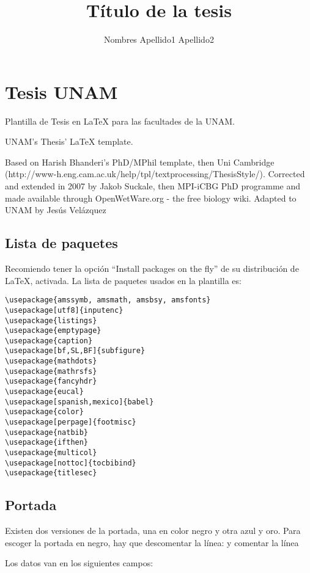 \documentclass[]{article}
\date{}
\begin{document}
\section{Tesis UNAM}\label{tesis-unam}

Plantilla de Tesis en LaTeX para las facultades de la UNAM.

UNAM's Thesis' LaTeX template.

Based on Harish Bhanderi's PhD/MPhil template, then Uni Cambridge
(http://www-h.eng.cam.ac.uk/help/tpl/textprocessing/ThesisStyle/).
Corrected and extended in 2007 by Jakob Suckale, then MPI-iCBG PhD
programme and made available through OpenWetWare.org - the free biology
wiki. Adapted to UNAM by Jesús Velázquez

\subsection{Lista de paquetes}\label{lista-de-paquetes}

Recomiendo tener la opción ``Install packages on the fly'' de su
distribución de LaTeX, activada. La lista de paquetes usados en la
plantilla es:

\begin{verbatim}
\usepackage{amssymb, amsmath, amsbsy, amsfonts}
\usepackage[utf8]{inputenc}
\usepackage{listings}
\usepackage{emptypage}
\usepackage{caption}
\usepackage[bf,SL,BF]{subfigure}
\usepackage{mathdots}
\usepackage{mathrsfs}
\usepackage{fancyhdr}
\usepackage{eucal}
\usepackage[spanish,mexico]{babel}
\usepackage{color}
\usepackage[perpage]{footmisc}
\usepackage{natbib}
\usepackage{ifthen}
\usepackage{multicol}
\usepackage[nottoc]{tocbibind}
\usepackage{titlesec}
\end{verbatim}

\subsection{Portada}\label{portada}

Existen dos versiones de la portada, una en color negro y otra azul y
oro. Para escoger la portada en negro, hay que descomentar la línea:
\portadafalse
y comentar la línea \portadatrue

Los datos van en los siguientes campos: \title{Título de la tesis}
\author{Nombres Apellido1 Apellido2} \\
 \\
\\
\end{document}
